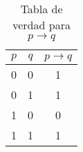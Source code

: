 \documentclass{article} %
\begin{document}
	
\begin{table}[h!]
	\centering
	\begin{tabular}{|c|c|c|} \hline
		$p$ & $q$ & $p\rightarrow q$\\\hline
		0 & 0 & 1 \\
		0 & 1 & 1 \\
		1 & 0 & 0 \\
		1 & 1 & 1 \\\hline
	\end{tabular}
	\caption{Tabla de verdad para
		$p \rightarrow q$}
\end{table}
\end{document}
